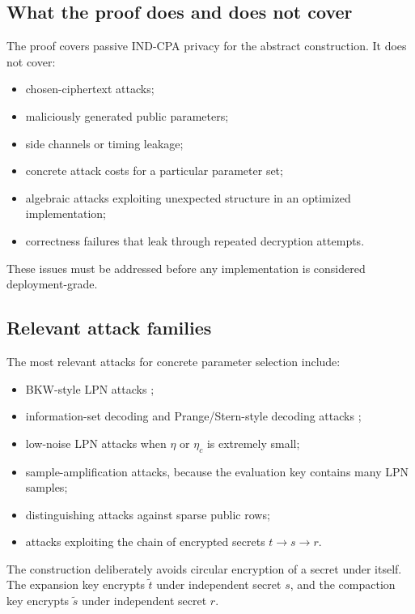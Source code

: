 \subsection{What the proof does and does not cover}

The proof covers passive IND-CPA privacy for the abstract construction.  It does not cover:
\begin{itemize}
    \item chosen-ciphertext attacks;
    \item maliciously generated public parameters;
    \item side channels or timing leakage;
    \item concrete attack costs for a particular parameter set;
    \item algebraic attacks exploiting unexpected structure in an optimized implementation;
    \item correctness failures that leak through repeated decryption attempts.
\end{itemize}
These issues must be addressed before any implementation is considered deployment-grade.

\subsection{Relevant attack families}

The most relevant attacks for concrete parameter selection include:
\begin{itemize}
    \item BKW-style LPN attacks \cite{BlumKalaiWasserman2003};
    \item information-set decoding and Prange/Stern-style decoding attacks \cite{Prange1962,Stern1989};
    \item low-noise LPN attacks when $\eta$ or $\eta_c$ is extremely small;
    \item sample-amplification attacks, because the evaluation key contains many LPN samples;
    \item distinguishing attacks against sparse public rows;
    \item attacks exploiting the chain of encrypted secrets $t\to s\to r$.
\end{itemize}
The construction deliberately avoids circular encryption of a secret under itself.  The expansion key encrypts $\tilde{t}$ under independent secret $s$, and the compaction key encrypts $\tilde{s}$ under independent secret $r$.
